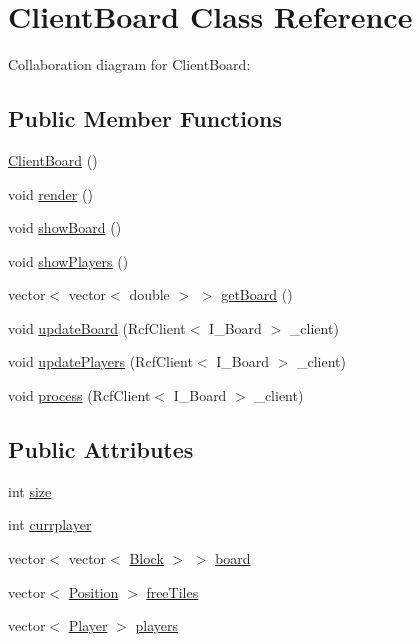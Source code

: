 \hypertarget{classClientBoard}{\section{Client\-Board Class Reference}
\label{classClientBoard}
}


Collaboration diagram for Client\-Board\-:
\subsection*{Public Member Functions}
\begin{DoxyCompactItemize}
\item 
\hyperlink{classClientBoard_a337e3faf170defc4c3aba5496fdec9b9}{Client\-Board} ()
\item 
void \hyperlink{classClientBoard_ad0d1c106e118e4331464bc39480eab3a}{render} ()
\item 
void \hyperlink{classClientBoard_a21a7c3d7cd79dd02b03e48e8750f13fa}{show\-Board} ()
\item 
void \hyperlink{classClientBoard_ae93755a646c670a1a459a146d4893c43}{show\-Players} ()
\item 
vector$<$ vector$<$ double $>$ $>$ \hyperlink{classClientBoard_a0be88ab8f9bbf8775dab0ffa28dd624e}{get\-Board} ()
\item 
void \hyperlink{classClientBoard_ac6e565283b818915cfe02b7036c21806}{update\-Board} (Rcf\-Client$<$ I\-\_\-\-Board $>$ \-\_\-client)
\item 
void \hyperlink{classClientBoard_a91492fbea3cf61fd719e8e80d087f6e1}{update\-Players} (Rcf\-Client$<$ I\-\_\-\-Board $>$ \-\_\-client)
\item 
void \hyperlink{classClientBoard_aa61c1ad5c6fa8411d447e5ca6b5de35c}{process} (Rcf\-Client$<$ I\-\_\-\-Board $>$ \-\_\-client)
\end{DoxyCompactItemize}
\subsection*{Public Attributes}
\begin{DoxyCompactItemize}
\item 
int \hyperlink{classClientBoard_a57e4ae5f47ccbaeed3e32e18e9b259de}{size}
\item 
int \hyperlink{classClientBoard_a1c82f70c45cae36e7c2c9d6a148c86a6}{currplayer}
\item 
vector$<$ vector$<$ \hyperlink{classBlock}{Block} $>$ $>$ \hyperlink{classClientBoard_a7014b61049200cd5e271ffb4cda0f890}{board}
\item 
vector$<$ \hyperlink{classPosition}{Position} $>$ \hyperlink{classClientBoard_a11d9f78a2f2abd23b2da0983b4eac9b7}{free\-Tiles}
\item 
vector$<$ \hyperlink{classPlayer}{Player} $>$ \hyperlink{classClientBoard_a1c232f1a961f552d95a1db54d90dc432}{players}
\end{DoxyCompactItemize}


